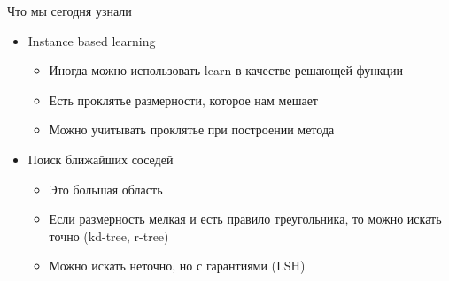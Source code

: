 \documentclass[14pt, fleqn, xcolor={dvipsnames, table}]{beamer}
\begin{document}
\begin{frame}{Что мы сегодня узнали}
\begin{itemize}
  \item Instance based learning
    \begin{itemize}
      \item Иногда можно использовать learn в качестве решающей функции
      \item Есть проклятье размерности, которое нам мешает
      \item Можно учитывать проклятье при построении метода
    \end{itemize}
  \item Поиск ближайших соседей
  \begin{itemize}
    \item Это большая область
    \item Если размерность мелкая и есть правило треугольника, то можно искать точно (kd-tree, r-tree)
    \item Можно искать неточно, но с гарантиями (LSH)
  \end{itemize}
\end{itemize}
\end{frame}
\end{document}
